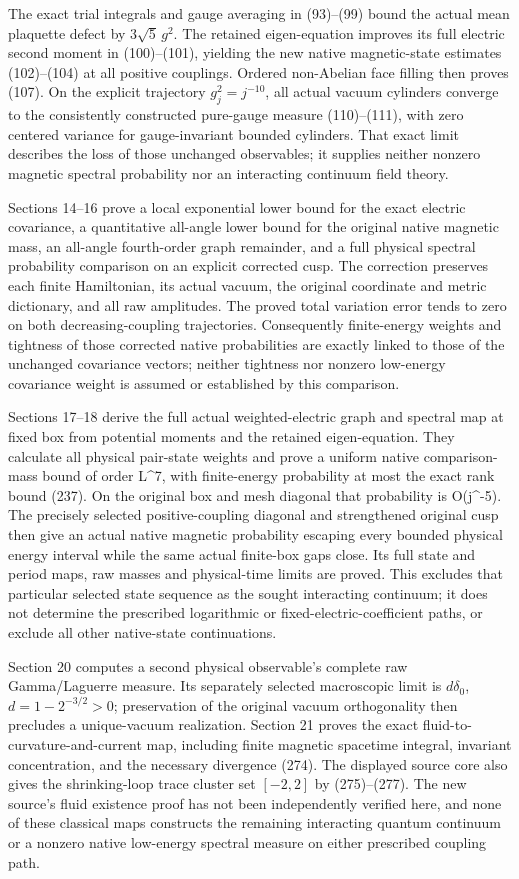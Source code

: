 \documentclass[
  11pt,
]{article}
\begin{document}
The exact trial integrals and gauge averaging in (93)--(99) bound the
actual mean plaquette defect by \(3\sqrt5\,g^2\). The retained
eigen-equation improves its full electric second moment in (100)--(101),
yielding the new native magnetic-state estimates (102)--(104) at all
positive couplings. Ordered non-Abelian face filling then proves (107).
On the explicit trajectory \(g_j^2=j^{-10}\), all actual vacuum
cylinders converge to the consistently constructed pure-gauge measure
(110)--(111), with zero centered variance for gauge-invariant bounded
cylinders. That exact limit describes the loss of those unchanged
observables; it supplies neither nonzero magnetic spectral probability
nor an interacting continuum field theory.

Sections 14--16 prove a local exponential lower bound for the exact
electric covariance, a quantitative all-angle lower bound for the
original native magnetic mass, an all-angle fourth-order graph
remainder, and a full physical spectral probability comparison on an
explicit corrected cusp. The correction preserves each finite
Hamiltonian, its actual vacuum, the original coordinate and metric
dictionary, and all raw amplitudes. The proved total variation error
tends to zero on both decreasing-coupling trajectories. Consequently
finite-energy weights and tightness of those corrected native
probabilities are exactly linked to those of the unchanged covariance
vectors; neither tightness nor nonzero low-energy covariance weight is
assumed or established by this comparison.

Sections 17--18 derive the full actual weighted-electric graph and
spectral map at fixed box from potential moments and the retained
eigen-equation. They calculate all physical pair-state weights and prove
a uniform native comparison-mass bound of order L\^{}7, with
finite-energy probability at most the exact rank bound (237). On the
original box and mesh diagonal that probability is O(j\^{}-5). The
precisely selected positive-coupling diagonal and strengthened original
cusp then give an actual native magnetic probability escaping every
bounded physical energy interval while the same actual finite-box gaps
close. Its full state and period maps, raw masses and physical-time
limits are proved. This excludes that particular selected state sequence
as the sought interacting continuum; it does not determine the
prescribed logarithmic or fixed-electric-coefficient paths, or exclude
all other native-state continuations.

Section 20 computes a second physical observable's complete raw
Gamma/Laguerre measure. Its separately selected macroscopic limit is
\(d\delta_0\), \(d=1-2^{-3/2}>0\); preservation of the original vacuum
orthogonality then precludes a unique-vacuum realization. Section 21
proves the exact fluid-to-curvature-and-current map, including finite
magnetic spacetime integral, invariant concentration, and the necessary
divergence (274). The displayed source core also gives the
shrinking-loop trace cluster set \([-2,2]\) by (275)--(277). The new
source's fluid existence proof has not been independently verified here,
and none of these classical maps constructs the remaining interacting
quantum continuum or a nonzero native low-energy spectral measure on
either prescribed coupling path.
\end{document}
